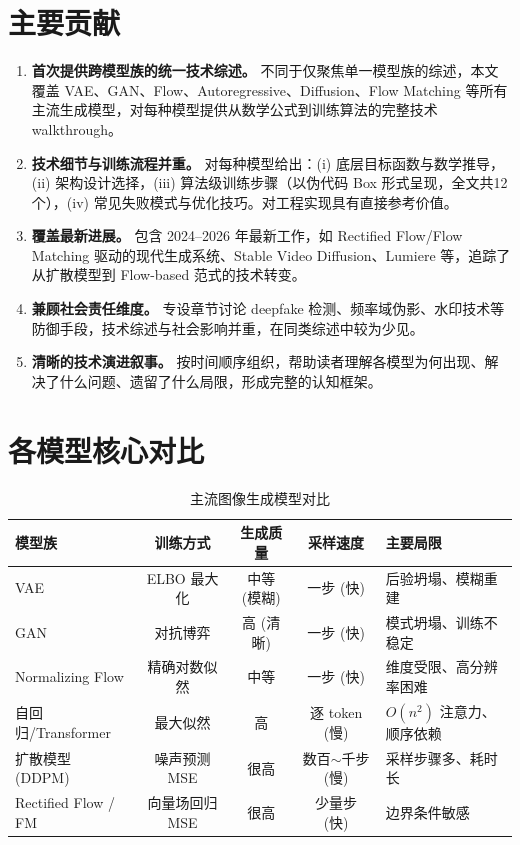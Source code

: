 \documentclass[11pt,a4paper]{ctexart}
\begin{document}
\section{主要贡献}

\begin{enumerate}[leftmargin=*, itemsep=2pt]
    \item \textbf{首次提供跨模型族的统一技术综述。}
    不同于仅聚焦单一模型族的综述，本文覆盖 VAE、GAN、Flow、Autoregressive、Diffusion、Flow Matching 等所有主流生成模型，对每种模型提供从数学公式到训练算法的完整技术 walkthrough。

    \item \textbf{技术细节与训练流程并重。}
    对每种模型给出：(i) 底层目标函数与数学推导，(ii) 架构设计选择，(iii) 算法级训练步骤（以伪代码 Box 形式呈现，全文共12个），(iv) 常见失败模式与优化技巧。对工程实现具有直接参考价值。

    \item \textbf{覆盖最新进展。}
    包含 2024--2026 年最新工作，如 Rectified Flow/Flow Matching 驱动的现代生成系统、Stable Video Diffusion、Lumiere 等，追踪了从扩散模型到 Flow-based 范式的技术转变。

    \item \textbf{兼顾社会责任维度。}
    专设章节讨论 deepfake 检测、频率域伪影、水印技术等防御手段，技术综述与社会影响并重，在同类综述中较为少见。

    \item \textbf{清晰的技术演进叙事。}
    按时间顺序组织，帮助读者理解各模型为何出现、解决了什么问题、遗留了什么局限，形成完整的认知框架。
\end{enumerate}

\section{各模型核心对比}

\begin{table}[htbp]
\centering
\caption{主流图像生成模型对比}
\label{tab:comparison}
\small
\begin{tabular}{@{}lcccl@{}}
\toprule
模型族 & 训练方式 & 生成质量 & 采样速度 & 主要局限 \\
\midrule
VAE              & ELBO 最大化     & 中等 (模糊)   & 一步 (快)    & 后验坍塌、模糊重建 \\
GAN              & 对抗博弈        & 高 (清晰)     & 一步 (快)    & 模式坍塌、训练不稳定 \\
Normalizing Flow & 精确对数似然    & 中等          & 一步 (快)    & 维度受限、高分辨率困难 \\
自回归/Transformer & 最大似然      & 高            & 逐 token (慢) & $O(n^2)$ 注意力、顺序依赖 \\
扩散模型 (DDPM)  & 噪声预测 MSE    & 很高          & 数百$\sim$千步 (慢) & 采样步骤多、耗时长 \\
Rectified Flow / FM & 向量场回归 MSE & 很高          & 少量步 (快)   & 边界条件敏感 \\
\bottomrule
\end{tabular}
\end{table}
\end{document}
